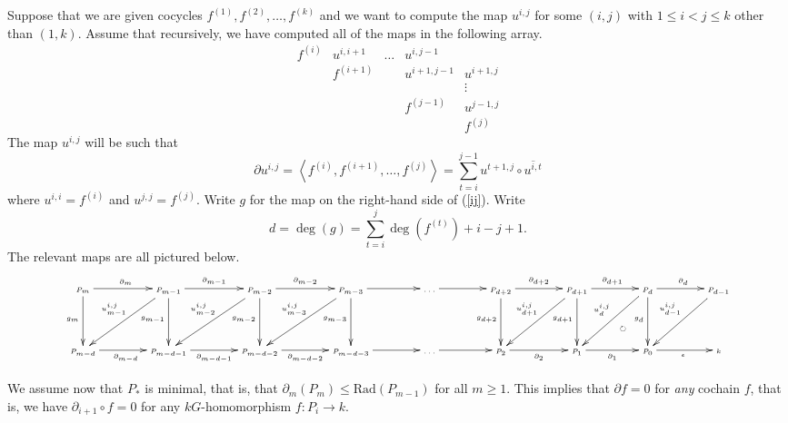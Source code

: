 \documentclass[12pt]{article}
\begin{document}
Suppose that we are given cocycles
$f^{\left(1\right)}, f^{\left(2\right)},\dots,f^{\left(k\right)}$
and we want to compute the 
map $u^{i,j}$ for some $\left(i,j\right)$
with $1\le i<j\le k$ other than $\left(1,k\right)$.
Assume that recursively,
we have computed all of the maps in the following array.
\[\begin{array}{ccccc}
f^{\left(i\right)}&u^{i,i+1}
&\dots&u^{i,j-1}&\\
&f^{\left(i+1\right)}&&u^{i+1,j-1}
&u^{i+1,j}\\
&&&&\vdots\\
&&&f^{\left(j-1\right)}&u^{j-1,j}\\
&&&&f^{\left(j\right)}
\end{array}\]
The map $u^{i,j}$ will be such that
\begin{equation}\label{ij}
\partial u^{i,j}=
\left\langle f^{\left(i\right)}, f^{\left(i+1\right)},\dots, 
f^{\left(j\right)}\right\rangle
=\sum_{t=i}^{j-1}
u^{t+1,j}\circ
\overline{u^{i,t}}
\end{equation}
where $u^{i,i}=f^{\left(i\right)}$
and $u^{j,j}=f^{\left(j\right)}$.
Write $g$ for the map on the right-hand side
of (\ref{ij}).
Write \[d=\deg\left(g\right)
=\sum_{t=i}^j\deg\left(f^{\left(t\right)}\right)+i-j+1.\]
The relevant maps are all pictured below.
\begin{equation}\label{masseypic}\tiny
\begin{xy}{\xymatrix@+13pt{
P_m\ar[r]^{\partial_m}\ar[d]_{g_m}
&P_{m-1}\ar[r]^{\partial_{m-1}}\ar[d]_{g_{m-1}}\ar[dl]_{u^{i,j}_{m-1}}
&P_{m-2}\ar[r]^{\partial_{m-2}}\ar[d]_{g_{m-2}}\ar[dl]_{u^{i,j}_{m-2}}
&P_{m-3}\ar[r]\ar[d]_{g_{m-3}}\ar[dl]_{u^{i,j}_{m-3}}
&\dots\ar[r]
&P_{d+2}\ar[r]^{\partial_{d+2}}\ar[d]_{g_{d+2}}
&P_{d+1}\ar[r]^{\partial_{d+1}}\ar[d]_{g_{d+1}}\ar[dl]_{u^{i,j}_{d+1}}
&P_d\ar[d]_{g_d}\ar[r]^{\partial_d}\ar[dl]_{u^{i,j}_d}
&P_{d-1}\ar[dl]_{u^{i,j}_{d-1}}
\\
P_{m-d}\ar[r]_{\partial_{m-d}}
&P_{m-d-1}\ar[r]_{\partial_{m-d-1}}
&P_{m-d-2}\ar[r]_{\partial_{m-d-2}}
&P_{m-d-3}\ar[r]
&\dots\ar[r]
&P_2\ar[r]_{\partial_2}
&P_1\ar[r]_{\partial_1}
&P_0\ar[r]_\epsilon&k
}};
"2,8";"1,7"**{};
?(.35)*{\circlearrowright}
\end{xy}
\end{equation}

We assume now that $P_\ast$ is minimal, that is,
that $\partial_m\left(P_m\right)\le\mathrm{Rad}\left(P_{m-1}\right)$
for all $m\ge 1$.
This implies that $\partial f=0$ for {\em any} cochain $f$,
that is, we have $\partial_{i+1}\circ f=0$ for any
$kG$-homomorphism $f:P_i\to k$.
\end{document}
